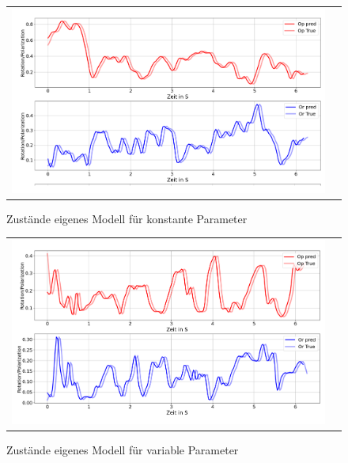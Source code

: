 \begin{appendices}
\begin{figure}[H]
\centering
\begin{tabular}{cc}
\includegraphics[width=1.0\textwidth]{figures/Anhang/PWD_random_False.png} 
\end{tabular}
\caption{Zustände eigenes Modell für konstante Parameter }
\end{figure}

\begin{figure}[H]
\centering
\begin{tabular}{cc}
\includegraphics[width=1.0\textwidth]{figures/Anhang/PWD_random_True.png} 
\end{tabular}
\caption{Zustände eigenes Modell für variable Parameter }
\end{figure}


\end{appendices}
